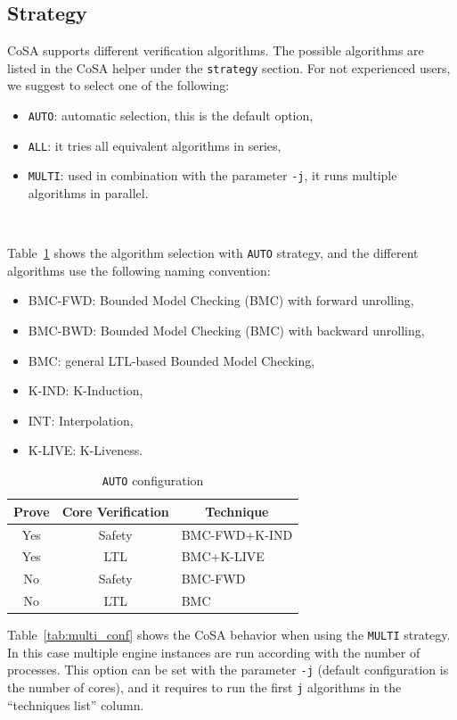 \documentclass{article}
\theoremstyle{definition}
\begin{document}
\subsection{Strategy}
CoSA supports different verification algorithms. The possible
algorithms are listed in the CoSA helper under the \texttt{strategy}
section. For not experienced users, we suggest to select one of the
following:
\begin{itemize}
\item \texttt{AUTO}: automatic selection, this is the default option,
\item \texttt{ALL}: it tries all equivalent algorithms in series,
\item \texttt{MULTI}: used in combination with the parameter
  \texttt{-j}, it runs multiple algorithms in parallel.
\end{itemize}

\

Table~\ref{tab:auto_conf} shows the algorithm selection with
\texttt{AUTO} strategy, and the different algorithms use the following
naming convention:
\begin{itemize}
\item BMC-FWD: Bounded Model Checking (BMC) with forward unrolling,
\item BMC-BWD: Bounded Model Checking (BMC) with backward unrolling,
\item BMC: general LTL-based Bounded Model Checking,
\item K-IND: K-Induction,
\item INT: Interpolation,
\item K-LIVE: K-Liveness.
\end{itemize}

\begin{table}[h]
  \centering
\begin{tabular}{ c c | l }
  Prove & Core Verification & \multicolumn{1}{|c}{Technique} \\ \hline
  Yes & Safety & BMC-FWD+K-IND  \\
  Yes & LTL & BMC+K-LIVE  \\
  No & Safety & BMC-FWD  \\
  No & LTL & BMC  \\
\end{tabular}
\caption{\texttt{AUTO} configuration}
\label{tab:auto_conf}
\end{table}

Table~\ref{tab:multi_conf} shows the CoSA behavior when using the
\texttt{MULTI} strategy. In this case multiple engine instances are
run according with the number of processes. This option can be set
with the parameter \texttt{-j} (default configuration is the number of
cores), and it requires to run the first \texttt{j} algorithms in the
``techniques list'' column.
\end{document}
